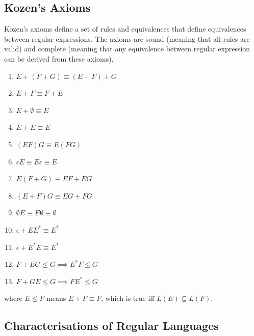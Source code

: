 \documentclass{article}
\begin{document}
    \subsection{Kozen's Axioms}
        Kozen's axioms define a set of rules and equivalences that define equivalences between regular expressions. The axioms are sound (meaning that all rules are valid) and complete (meaning that any equivalence between regular expression can be derived from these axioms). 
        \begin{enumerate}
            \item $E + (F + G) \equiv (E + F) + G$
            \item $E + F \equiv F + E$
            \item $E + \emptyset \equiv E$
            \item $E + E \equiv E$
            \item $(EF)G \equiv E(FG) $
            \item $\epsilon E \equiv E \epsilon \equiv E$
            \item $E(F + G) \equiv EF + EG$
            \item $(E + F)G \equiv EG + FG$
            \item $\emptyset E \equiv E \emptyset \equiv \emptyset$
            \item $\epsilon + EE^* \equiv E^*$
            \item $\epsilon + E^* E \equiv E^*$
            \item $F + EG \leq G \implies E^*F \leq G$
            \item $F + GE \leq G \implies FE^* \leq G$
        \end{enumerate}
        where $E \leq F$ means $E + F \equiv F$, which is true iff $L(E) \subseteq L(F)$.
    \subsection{Characterisations of Regular Languages}
\end{document}
